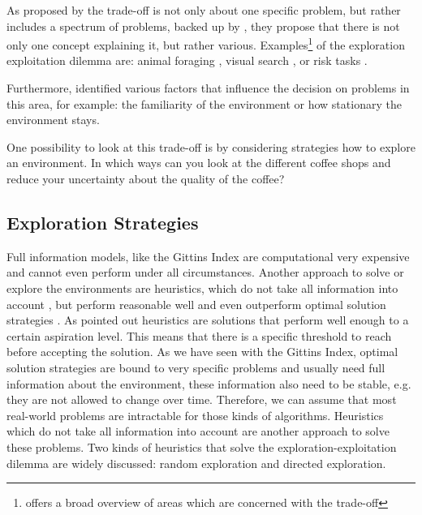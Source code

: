As proposed by \cite{cohen2007should} the trade-off is not only about one specific problem, but rather includes a spectrum of problems, backed up by \cite{mehlhorn2015unpacking}, they propose that there is not only one concept explaining it, but rather various. Examples\footnote{\cite{hills2015exploration} offers a broad overview of areas which are concerned with the trade-off} of the exploration exploitation dilemma are: animal foraging \citep{cook2013exploration}, visual search \citep{chun1996just}, or risk tasks \citep{gonzalez2011instance}.

Furthermore, \cite{cohen2007should} identified various factors that influence the decision on problems in this area, for example: the familiarity of the environment or how stationary the environment stays.

One possibility to look at this trade-off is by considering strategies how to explore an environment. In which ways can you look at the different coffee shops and reduce your uncertainty about the quality of the coffee? 
\subsection{Exploration Strategies}
Full information models, like the Gittins Index are computational very expensive and cannot even perform under all circumstances. Another approach to solve or explore the environments are heuristics, which do not take all information into account \citep{parpart2018heuristics}, but perform reasonable well and even outperform optimal solution strategies \citep{gigerenzer1996reasoning, gigerenzer1999simple, katsikopoulos2010robust}. As \cite{gigerenzer2009homo} pointed out heuristics are solutions that perform well enough to a certain aspiration level. This means that there is a specific threshold to reach before accepting the solution. As we have seen with the Gittins Index, optimal solution strategies are bound to very specific problems and usually need full information about the environment, these information also need to be stable, e.g. they are not allowed to change over time. Therefore, we can assume that most real-world problems are intractable for those kinds of algorithms. Heuristics which do not take all information into account are another approach to solve these problems. Two kinds of heuristics that solve the exploration-exploitation dilemma are widely discussed: random exploration and directed exploration.

